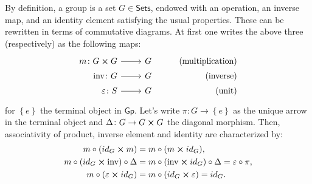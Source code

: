 \documentclass[../Main]{subfiles}
\begin{document}
\begin{rem}[]
	By definition, a group is a set $G \in \mathsf{Sets}$, endowed with an operation,
	an inverse map, and an identity element satisfying the usual properties.
	These can be rewritten in terms of commutative diagrams.
	At first one writes the above three (respectively) as the following maps:
	\begin{equation*}
			\begin{tikzcd}[row sep = 0ex
         ,/tikz/column 1/.append style={anchor=base east}
         ,/tikz/column 2/.append style={anchor=base west}
         ,/tikz/column 3/.append style={anchor=base east}]
			m\colon G \cross G \arrow[r, "", rightarrow] &
			G & \text{(multiplication)} \\
			\mathrm{inv}\colon G \arrow[r, "", rightarrow] &
			G & \text{(inverse)} \\
			\varepsilon \colon S \arrow[r, "", rightarrow] &
			G & \text{(unit)} 
		\end{tikzcd}
	\end{equation*} 
	for $\left\{ e \right\}$ the terminal object in $\mathsf{Gp}$.
	Let's write $\pi\colon G \to \left\{ e \right\}$
	as the unique arrow in the terminal object
	and $\Delta\colon G \to G \cross G$ the diagonal morphism.
	Then, associativity of product, inverse element and
	identity are characterized by: 
	\begin{align}\label{eq:GroupAxioms}
		m \circ (id_G \cross m) &= m \circ (m \cross id_G),\nonumber\\
		m \circ (id_G \cross \mathrm{inv}) \circ \Delta &=
		m \circ (\mathrm{inv} \cross id_G) \circ \Delta = \varepsilon \circ \pi,\\
		m \circ (\varepsilon \cross id_G) &=
		m \circ (id_G \cross \varepsilon) = id_G\nonumber
	.\end{align} 
\end{rem}
\end{document}

